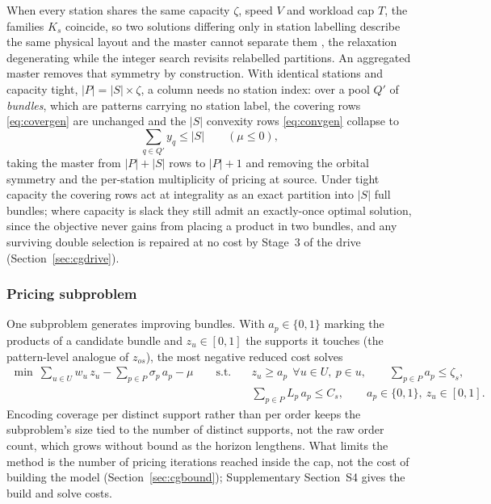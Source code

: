 \documentclass[]{interact}
\begin{document}
When every station shares the same capacity $\zeta$, speed $V$ and workload cap $T$, the families $K_s$ coincide, so two solutions differing only in station labelling describe the same physical layout and the master cannot separate them \citep{vanderbeck2000dw}, the relaxation degenerating while the integer search revisits relabelled partitions. An aggregated master removes that symmetry by construction. With identical stations and capacity tight, $|P| = |S|\times\zeta$, a column needs no station index: over a pool $Q'$ of \emph{bundles}, which are patterns carrying no station label, the covering rows \eqref{eq:covergen} are unchanged and the $|S|$ convexity rows \eqref{eq:convgen} collapse to
\begin{equation}
\sum_{q \in Q'} y_q \le |S| \qquad (\mu \le 0),
\label{eq:card}
\end{equation}
taking the master from $|P|+|S|$ rows to $|P|+1$ and removing the orbital symmetry and the per-station multiplicity of pricing at source. Under tight capacity the covering rows act at integrality as an exact partition into $|S|$ full bundles; where capacity is slack they still admit an exactly-once optimal solution, since the objective never gains from placing a product in two bundles, and any surviving double selection is repaired at no cost by Stage~3 of the drive (Section~\ref{sec:cgdrive}).

\subsubsection{Pricing subproblem}\label{sec:cgpricing}
One subproblem generates improving bundles. With $a_p \in \{0,1\}$ marking the products of a candidate bundle and $z_u \in [0,1]$ the supports it touches (the pattern-level analogue of $z_{os}$), the most negative reduced cost solves
\[
\begin{aligned}
\min\ \sum_{u \in U} w_u\, z_u - \sum_{p \in P} \sigma_p\, a_p - \mu
\qquad \text{s.t.} \quad & z_u \ge a_p\ \ \forall u \in U,\ p \in u, \qquad \sum_{p \in P} a_p \le \zeta_s, \\
& \sum_{p \in P} L_p\, a_p \le C_s, \qquad a_p \in \{0,1\},\ z_u \in [0,1].
\end{aligned}
\]
Encoding coverage per distinct support rather than per order keeps the subproblem's size tied to the number of distinct supports, not the raw order count, which grows without bound as the horizon lengthens. What limits the method is the number of pricing iterations reached inside the cap, not the cost of building the model (Section~\ref{sec:cgbound}); Supplementary Section~S4 gives the build and solve costs.
\end{document}
